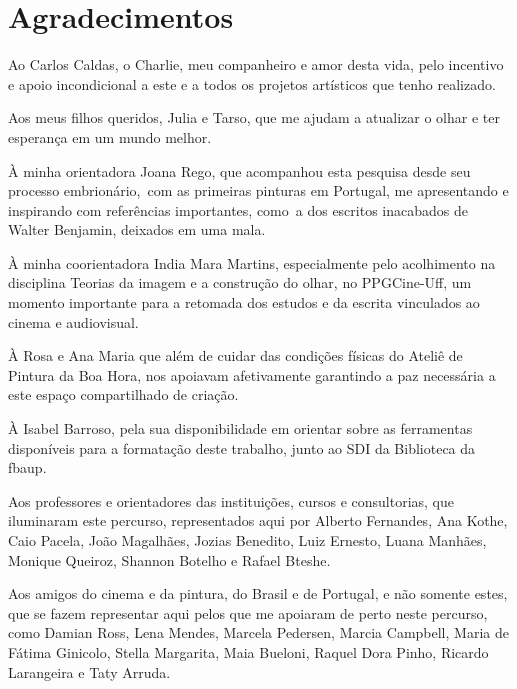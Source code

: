\cover

\titlepage

\thispagestyle{empty}


\chapter*{Agradecimentos}

\thispagestyle{empty}

Ao Carlos Caldas, o Charlie, meu companheiro e amor desta vida, pelo
incentivo e apoio incondicional a este e a todos os projetos artísticos
que tenho realizado.

Aos meus filhos queridos, Julia e Tarso, que me ajudam a atualizar o
olhar e ter esperança em um mundo melhor.

À minha orientadora Joana Rego, que acompanhou esta pesquisa desde seu
processo embrionário,~com as primeiras pinturas em Portugal, me
apresentando e inspirando com referências importantes, como~a dos
escritos inacabados de Walter Benjamin, deixados em uma mala.

À minha coorientadora India Mara Martins, especialmente pelo acolhimento
na disciplina Teorias da imagem e a construção do olhar, no PPGCine-Uff,
um momento importante para a retomada dos estudos e da escrita
vinculados ao cinema e audiovisual.

À Rosa e Ana Maria que além de cuidar das condições físicas do Ateliê de
Pintura da Boa Hora, nos apoiavam afetivamente garantindo a paz
necessária a este espaço compartilhado de criação.

À Isabel Barroso, pela sua disponibilidade em orientar sobre as
ferramentas disponíveis para a formatação deste trabalho, junto ao SDI
da Biblioteca da \ac{fbaup}.

Aos professores e orientadores das instituições, cursos e consultorias,
que iluminaram este percurso, representados aqui por Alberto Fernandes, Ana Kothe, Caio
Pacela, João Magalhães, Jozias Benedito, Luiz Ernesto, Luana Manhães,
Monique Queiroz, Shannon Botelho e Rafael Bteshe.

Aos amigos do cinema e da pintura, do Brasil e de Portugal, e não
somente estes, que se fazem representar aqui pelos que me apoiaram de
perto neste percurso, como Damian Ross, Lena Mendes, Marcela Pedersen, Marcia
Campbell, Maria de Fátima Ginicolo, Stella Margarita, Maia Bueloni,
Raquel Dora Pinho, Ricardo Larangeira e Taty Arruda.

\clearpage

\thispagestyle{abstract}

